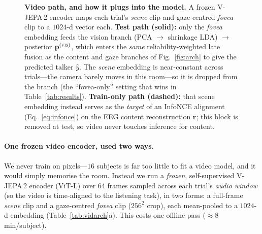 \documentclass[10pt,twocolumn]{article}
\begin{document}
\begin{figure}[t]
\caption{\textbf{Video path, and how it plugs into the model.} A frozen
V-JEPA\,2 encoder maps each trial's \emph{scene} clip and gaze-centred
\emph{fovea} clip to a $1024$-d vector each. \textbf{Test path (solid):} only the
\emph{fovea} embedding feeds the vision branch (PCA $\to$ shrinkage LDA) $\to$
posterior $\mathbf p^{(\textsc{vis})}$, which enters the \emph{same}
reliability-weighted late fusion as the content and gaze branches of
Fig.~\ref{fig:arch} to give the predicted talker $\hat y$. The \emph{scene}
embedding is near-constant across trials---the camera barely moves in this
room---so it is dropped from the branch (the ``fovea-only'' setting that wins in
Table~\ref{tab:results}). \textbf{Train-only path (dashed):} that scene embedding
instead serves as the \emph{target} of an InfoNCE alignment (Eq.~\ref{eq:infonce})
on the EEG content reconstruction $\bar{\mathbf r}$; this block is removed at test,
so video never touches inference for content.}
\label{fig:vidarch}
\end{figure}

\paragraph{One frozen video encoder, used two ways.}
We never train on pixels---$16$ subjects is far too little to fit a video model,
and it would simply memorise the room. Instead we run a \emph{frozen},
self-supervised V-JEPA\,2 encoder (ViT-L) over $64$ frames sampled across each
trial's \emph{audio window} (so the video is time-aligned to the listening task),
in two forms: a full-frame \emph{scene} clip and a gaze-centred \emph{fovea} clip
($256^2$ crop), each mean-pooled to a $1024$-d embedding
(Table~\ref{tab:vidarch}a). This costs one offline pass ($\approx\!8$\,min/subject).
\end{document}
